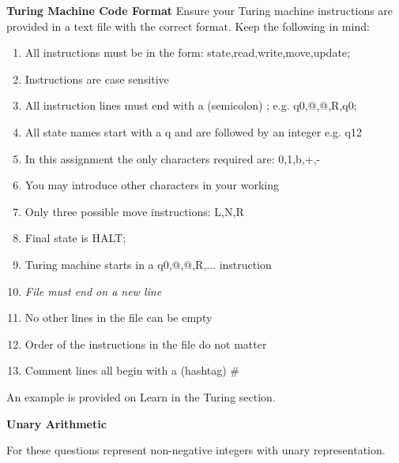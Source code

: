 \documentclass[11pt]{report}
\begin{document}
{\bf Turing Machine Code Format} Ensure your Turing machine instructions are provided in a text file with the correct format. Keep the following in mind:

	\begin{enumerate}
		\item All instructions must be in the form: state,read,write,move,update;
		\item Instructions are case sensitive
		\item All instruction lines must end with a (semicolon) ; e.g. q0,@,@,R,q0;
		\item All state names start with a q and are followed by an integer e.g. q12
		\item In this assignment the only characters required are: 0,1,b,+,-
		\item You may introduce other characters in your working
		\item Only three possible move instructions: L,N,R
		\item Final state is HALT;
		\item Turing machine starts in a q0,@,@,R,... instruction
		\item \emph{File must end on a new line}
		\item No other lines in the file can be empty
		\item Order of the instructions in the file do not matter
		\item Comment lines all begin with a (hashtag) \# 
	\end{enumerate}

	An example is provided on Learn in the Turing section.


\newpage
\begin{center}
	{\bf Unary Arithmetic}
\end{center}

	For these questions represent non-negative integers with unary representation.
\end{document}
